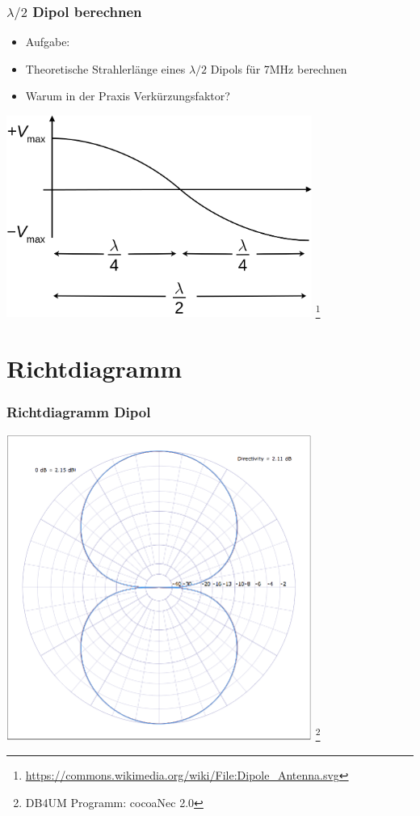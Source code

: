 \begin{frame}
    \frametitle{$\lambda / 2$ Dipol berechnen}
    \begin{center}
	\begin{itemize}
		\item Aufgabe:
		\item Theoretische Strahlerlänge eines $\lambda / 2$ Dipols für 7MHz berechnen
		\item Warum in der Praxis Verkürzungsfaktor?
    \end{itemize}
        \includegraphics[width=0.75\textwidth]{e11/Dipole_Antenna.png}
        \footnote{\tiny \url{https://commons.wikimedia.org/wiki/File:Dipole_Antenna.svg}}
 	\end{center}
\end{frame}

\section*{Richtdiagramm}

\begin{frame}
    \frametitle{Richtdiagramm Dipol}
    \begin{center}
        \includegraphics[width=0.75\textwidth]{e11/Richt-Dipol.png}
        \footnote{\tiny DB4UM Programm: cocoaNec 2.0}
	\end{center}
\end{frame}

